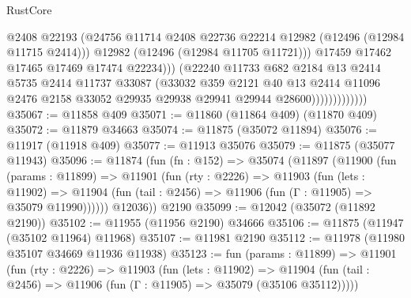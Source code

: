 \begin{lexlean}{RustCore}
\begin{coremodule}
                                  @2408
                                  @22193
                                  (@24756
                                    @11714
                                    @2408
                                    @22736
                                    @22214
                                    @12982
                                    (@12496 (@12984 @11715 @2414)))
                                  @12982
                                  (@12496 (@12984 @11705 @11721)))
                                @17459
                                @17462
                                @17465
                                @17469
                                @17474
                                @22234)))
                          (@22240
                            @11733
                            @682
                            @2184
                            @13
                            @2414
                            @5735
                            @2414
                            @11737
                            @33087
                            (@33032
                              @359
                              @2121
                              @40
                              @13
                              @2414
                              @11096
                              @2476
                              @2158
                              @33052
                              @29935
                              @29938
                              @29941
                              @29944
                              @28600)))))))))))))
@35067 := @11858 @409
@35071 := @11860 (@11864 @409) (@11870 @409)
@35072 := @11879 @34663
@35074 := @11875 (@35072 @11894)
@35076 := @11917 (@11918 @409)
@35077 := @11913 @35076
@35079 := @11875 (@35077 @11943)
@35096 := @11874
    (fun (fn : @152) =>
    @35074
      (@11897
        (@11900
          (fun (params : @11899) =>
          @11901
            (fun (rty : @2226) =>
            @11903
              (fun (lets : @11902) =>
              @11904 (fun (tail : @2456) => @11906 (fun (Γ : @11905) => @35079 @11990))))))
        @12036))
    @2190
@35099 := @12042 (@35072 (@11892 @2190))
@35102 := @11955 (@11956 @2190) @34666
@35106 := @11875 (@11947 (@35102 @11964) @11968)
@35107 := @11981 @2190
@35112 := @11978 (@11980 @35107 @34669 @11936 @11938)
@35123 := fun (params : @11899) =>
  @11901
    (fun (rty : @2226) =>
    @11903
      (fun (lets : @11902) =>
      @11904 (fun (tail : @2456) => @11906 (fun (Γ : @11905) => @35079 (@35106 @35112)))))

\end{coremodule}
\end{lexlean}
